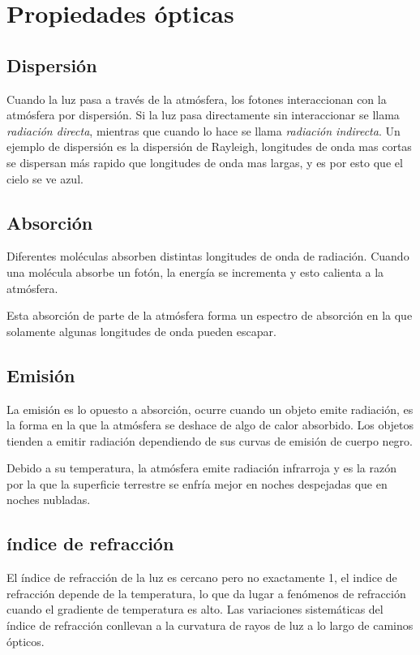 \documentclass{article} %
\begin{document}
\newpage

\section{Propiedades ópticas}
\subsection{Dispersión}

Cuando la luz pasa a través de la atmósfera, los fotones interaccionan con la atmósfera por \textit{}dispersión.
Si la luz pasa directamente sin interaccionar se llama \textit{radiación directa}, mientras que cuando lo hace se llama \textit{radiación indirecta}. Un ejemplo de dispersión es la dispersión de Rayleigh, longitudes de onda mas cortas se dispersan más rapido que longitudes de onda mas largas, y es por esto que el cielo se ve azul. 
\subsection{Absorción}

Diferentes moléculas absorben distintas longitudes de onda de radiación. Cuando una molécula absorbe un fotón, la energía se incrementa y esto calienta a la atmósfera.

Esta absorción de parte de la atmósfera forma un espectro de absorción en la que solamente algunas longitudes de onda pueden escapar.
\subsection{Emisión}

La emisión es lo opuesto a absorción, ocurre cuando un objeto emite radiación, es la forma en la que la atmósfera se deshace de algo de calor absorbido. Los objetos tienden a emitir radiación dependiendo de sus curvas de emisión de cuerpo negro.

Debido a su temperatura, la atmósfera emite radiación infrarroja y es la razón por la que la superficie terrestre se enfría mejor en noches despejadas que en noches nubladas.

\subsection{índice de refracción}

El índice de refracción de la luz es cercano pero no exactamente 1, el indice de refracción depende de la temperatura, lo que da lugar a fenómenos de refracción cuando el gradiente de temperatura es alto.
Las variaciones sistemáticas del índice de refracción conllevan a la curvatura de rayos de luz a lo largo de caminos ópticos.
\end{document}
